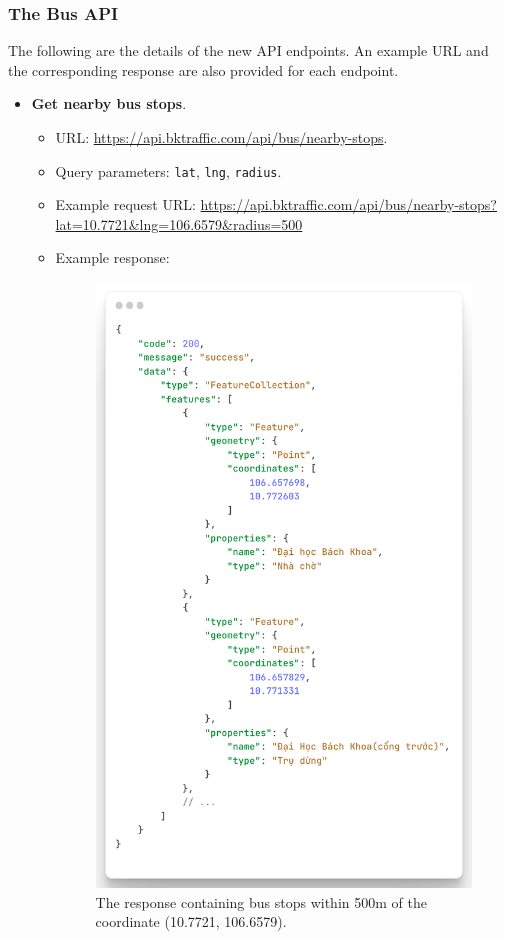 \subsubsection{The Bus API}
The following are the details of the new API endpoints. An example URL and the corresponding response are also provided for each endpoint.

\begin{itemize}
    
    \item \textbf{Get nearby bus stops}.
    
    \begin{itemize}
        \item URL: \url{https://api.bktraffic.com/api/bus/nearby-stops}.
        \item Query parameters: \lstinline{lat}, \lstinline{lng}, \lstinline{radius}.
        \item Example request URL: \url{https://api.bktraffic.com/api/bus/nearby-stops?lat=10.7721&lng=106.6579&radius=500}
        \item Example response: 
        \begin{figure}[H]
            \centering
            \includegraphics[width=0.5\linewidth]{assets/images/Implementation/nearby_bus_response.png}
            \caption{The response containing bus stops within 500m of the coordinate (10.7721, 106.6579).}
            \label{fig:nearby_stop_response}
        \end{figure}
    \end{itemize}


\end{itemize}
